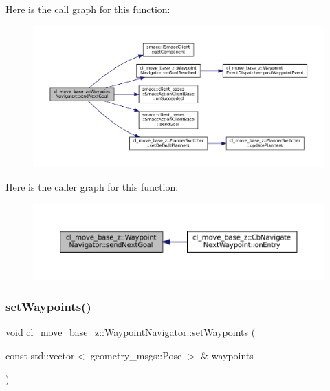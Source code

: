 Here is the call graph for this function\+:
\nopagebreak
\begin{figure}[H]
\begin{center}
\leavevmode
\includegraphics[width=350pt]{classcl__move__base__z_1_1WaypointNavigator_a1e0a8ff536d2d01a01063fd903029347_cgraph}
\end{center}
\end{figure}
Here is the caller graph for this function\+:
\nopagebreak
\begin{figure}[H]
\begin{center}
\leavevmode
\includegraphics[width=350pt]{classcl__move__base__z_1_1WaypointNavigator_a1e0a8ff536d2d01a01063fd903029347_icgraph}
\end{center}
\end{figure}
\mbox{\label{classcl__move__base__z_1_1WaypointNavigator_a477992dbb2eca9ee77a396d0fe1b084b}} 
\subsubsection{\texorpdfstring{set\+Waypoints()}{setWaypoints()}\hspace{0.1cm}{\footnotesize\ttfamily [1/2]}}
{\footnotesize\ttfamily void cl\+\_\+move\+\_\+base\+\_\+z\+::\+Waypoint\+Navigator\+::set\+Waypoints (\begin{DoxyParamCaption}\item[{const std\+::vector$<$ geometry\+\_\+msgs\+::\+Pose $>$ \&}]{waypoints }\end{DoxyParamCaption})}



